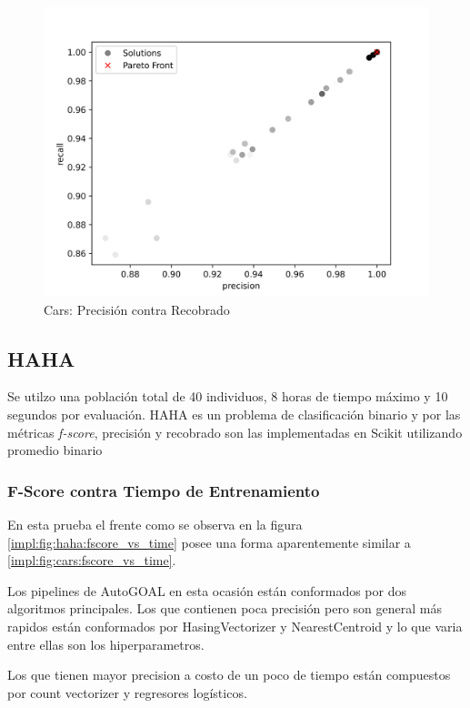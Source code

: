 \begin{figure}[ht]
    \centering
    \includegraphics[scale=0.65]{Pictures/cars_precision_vs_recall.jpg}
    \caption{Cars: Precisi\'on contra Recobrado}
    \label{impl:fig:cars:precision_vs_recall}
\end{figure}

\subsection{HAHA}
Se utilzo una poblaci\'on total de 40 individuos, 8 horas de tiempo m\'aximo y 10 segundos por  evaluaci\'on. 
HAHA es un problema de clasificaci\'on binario y por las m\'etricas \textit{f-score}, precisi\'on y recobrado son las implementadas en Scikit utilizando promedio binario 

\subsubsection{F-Score contra Tiempo de Entrenamiento}

En esta prueba el frente como se observa en la figura \ref{impl:fig:haha:fscore_vs_time} posee una forma aparentemente similar a \ref{impl:fig:cars:fscore_vs_time}. 

Los pipelines de AutoGOAL en esta ocasi\'on est\'an conformados por dos algoritmos principales. Los que contienen poca precisi\'on pero son general m\'as rapidos est\'an conformados por HasingVectorizer y NearestCentroid y  lo que varia entre ellas son los hiperparametros.

Los que tienen mayor precision a costo de un poco de tiempo est\'an compuestos por count vectorizer  y regresores log\'isticos.

